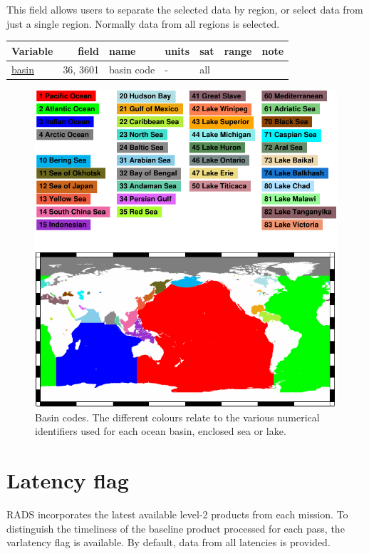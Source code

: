 \documentclass[a4paper,11pt,openany,natbib,nomargin]{thesis}
\makeatletter
\newcommand\var[1]{\url{#1}\index{variables!#1@\protect\url{#1}}}
\newenvironment{vartable}{
\begin{table}[ht]
\small
\begin{tabular}{lrllllr}
\hline
Variable & field & name & units & sat & range & note \\
\hline
}{
\hline
\end{tabular}
\end{table}
}
\makeatother
\begin{document}
This field allows users to separate the selected data by region, or select data from just a single region. Normally data from all regions is selected.

\begin{vartable}
\var{basin} & 36, 3601 & basin code & - & all && \\
\end{vartable}

\begin{figure}
\includegraphics[width=\textwidth]{basin_codes}
\caption{Basin codes. The different colours relate to the various numerical identifiers used for each ocean basin, enclosed sea or lake.}
\label{fig:basin_codes}
\end{figure}

\section{Latency flag}
RADS incorporates the latest available level-2 products from each mission. To distinguish the timeliness of the baseline product processed for each pass, the var{latency} flag is available. By default, data from all latencies is provided.
\end{document}
